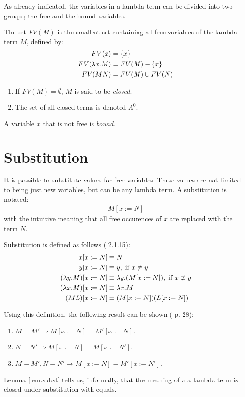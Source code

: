 As already indicated, the variables in a lambda term can be divided into
two groups; the free and the bound variables.

\begin{definition}
	The set $FV(M)$ is the smallest set containing all free variables of the lambda
	term $M$, defined by:
	\begin{align*}
		FV(x)&=\{x\} \\
		FV(\lambda x.M)&= FV(M) - \{x\} \\
		FV(M N) &= FV(M) \cup FV(N)
	\end{align*}
\end{definition}
\begin{definition}\mbox{}
	\begin{enumerate}
		\item If $FV(M)=\emptyset$, $M$ is said to be \emph{closed}.
		\item The set of all closed terms is denoted $\Lambda^0$.
	\end{enumerate}
\end{definition}
\begin{definition}
	A variable $x$ that is not free is \emph{bound}.
\end{definition}

\section{Substitution}

It is possible to substitute
values for free variables. These values are not limited to being just new
variables, but can be any lambda term. A substitution is notated:
\begin{align*}
	M[x:=N]
\end{align*}
with the intuitive meaning that all free occurences of $x$ are replaced with 
the term $N$.
\begin{definition}
Substitution is defined as follows (\cite{Barendregt} 2.1.15):
\begin{align*}
	x[x:=N]&\equiv N \\
	y[x:=N]&\equiv y, \text{ if } x \not\equiv y \\
	(\lambda y.M)[x:=N]&\equiv\lambda y.(M[x:=N]), \text{ if } x\not\equiv y \\
	(\lambda x.M)[x:=N]&\equiv\lambda x.M \\
	(M L)[x:=N]&\equiv(M[x:=N])(L[x:=N])
\end{align*}
\end{definition}
Using this definition, the following result can be shown (\cite{Barendregt} p. 28):
\begin{lemma}\label{lem:subst}\mbox{}
	\begin{enumerate}
		\item $M=M'\Rightarrow M[x:=N]=M'[x:=N]$.
		\item $N=N'\Rightarrow M[x:=N]=M[x:=N']$.
		\item $M=M', N=N'\Rightarrow M[x:=N]=M'[x:=N']$.
	\end{enumerate}
\end{lemma}
Lemma \ref{lem:subst} tells us, informally, that the meaning of a a lambda term
is closed under substitution with equals.

